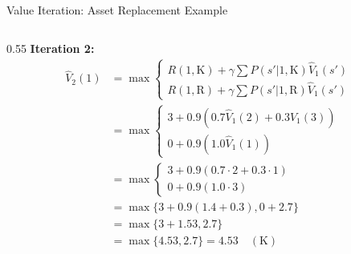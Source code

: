\documentclass[10pt]{beamer}
\DeclareMathOperator*{\maxop}{max} %
\begin{document}
\begin{frame}{Value Iteration: Asset Replacement Example}
\begin{columns}[T]
        \begin{column}{0.55\textwidth}
            \textbf{Iteration 2:} \scriptsize %
            \begin{align*}
                \hat{V}_2(1) &= \maxop \begin{cases}
                     R(1,\text{K}) + \gamma \sum P(s'|1,\text{K})\hat{V}_1(s') \\
                     R(1,\text{R}) + \gamma \sum P(s'|1,\text{R})\hat{V}_1(s')
                \end{cases} \\
                &= \maxop \begin{cases}
                    3 + 0.9(0.7 \hat{V}_1(2) + 0.3 \hat{V}_1(3)) \\
                    0 + 0.9(1.0 \hat{V}_1(1))
                \end{cases} \\
                &= \maxop \begin{cases}
                    3 + 0.9(0.7 \cdot 2 + 0.3 \cdot 1) \\
                    0 + 0.9(1.0 \cdot 3)
                \end{cases} \\
                 &= \maxop \{3 + 0.9(1.4 + 0.3), 0 + 2.7\} \\
                 &= \maxop \{3 + 1.53, 2.7\} \\
                &= \maxop \{4.53, 2.7\} = 4.53 \quad (\text{K})
            \end{align*}


\end{column}
\end{columns}
\end{frame}
\end{document}
